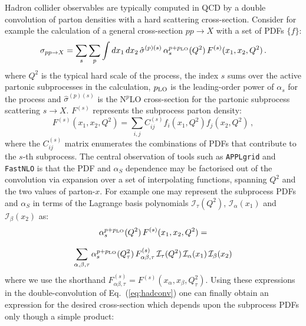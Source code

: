 \documentclass[preprint,12pt]{elsarticle}
\begin{document}
Hadron collider observables are typically computed in QCD by a double
convolution of parton densities with a hard scattering
cross-section. Consider for example the calculation of a general
cross-section $pp\to X$ with a set of PDFs $\{f\}$:
\begin{equation}\label{eq:hadconv}
  \sigma_{pp\to X} =
  \sum_{s}\sum_{p} \int dx_1\,dx_2\,
  \hat{\sigma}^{(p)(s)}\,\alpha_s^{p+p_{\rm LO}}(Q^2) \,F^{(s)}(x_1,x_2, Q^2)\,.
\end{equation}
where $Q^2$ is the typical hard scale of the process, the index
$s$ sums over the active partonic subprocesses in the calculation, $p_{\rm LO}$ is the leading-order power of $\alpha_s$ for the process
and $\hat{\sigma}^{(p)(s)}$ is the N$^p$LO cross-section for the partonic subprocess scattering $s\to X$. $F^{(s)}$ represents the 
subprocess parton density:
\begin{equation}\label{eq:APPLsubproc}
  F^{(s)}(x_1,x_2, Q^2) =\sum_{i,j} C^{(s)}_{ij} 
  f_i(x_{1},Q^2)f_j(x_{2},Q^2)\,,
\end{equation}
where the $C^{(s)}_{ij}$ matrix enumerates the combinations of PDFs
that contribute to the $s$-th subprocess.  The central observation of
tools such as {\tt APPLgrid} and {\tt FastNLO} is that the PDF and
$\alpha_S$ dependence may be factorised out of the convolution via
expansion over a set of interpolating functions, spanning $Q^2$ and
the two values of parton-$x$. For example one may represent the
subprocess PDFs and $\alpha_S$ in terms of the Lagrange basis
polynomials $\mathcal{I}_\tau(Q^2)$, $\mathcal{I}_\alpha(x_1)$ and
$\mathcal{I}_\beta(x_2)$ as:
\begin{equation}\label{eq:interpolation}
\begin{array}{c}
\displaystyle \alpha_s^{p+p_{\rm LO}}(Q^2) \,F^{(s)}(x_1,x_2, Q^2)
  =\\
\\
\displaystyle \sum_{\alpha,\beta,\tau} \alpha_s^{p+p_{\rm LO}}(Q_\tau^2)
  \,F^{(s)}_{\alpha\beta , \tau}
  \,\mathcal{I}_\tau(Q^2)\,\mathcal{I}_\alpha(x_1)
  \,\mathcal{I}_\beta(x_2)
\end{array}
\end{equation}
where we use the shorthand
$F^{(s)}_{\alpha\beta ,\tau} = F^{(s)}(x_\alpha, x_\beta,Q_\tau^2)$.
Using these expressions in the double-convolution of
Eq.~(\ref{eq:hadconv}) one can finally obtain an expression for the
desired cross-section which depends upon the subprocess PDFs only
though a simple product:
\end{document}
